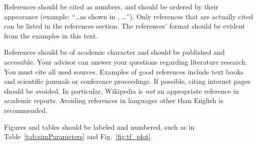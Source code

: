 \documentclass[journal, a4paper]{IEEEtran}
\begin{document}
    References should be cited as numbers, and should be ordered by their appearance (example: ``\ldots as shown in \cite{HOP96}, \ldots'').
    Only references that are actually cited can be listed in the references section.
    The references' format should be evident from the examples in this text.

    References should be of academic character and should be published and accessible.
    Your advisor can answer your questions regarding literature research.
    You must cite all used sources.
    Examples of good references include text books and scientific journals or conference proceedings.
    If possible, citing internet pages should be avoided. In particular, Wikipedia is \emph{not} an appropriate reference in academic reports.
    Avoiding references in languages other than English is recommended.

    Figures and tables should be labeled and numbered, such as in Table~\ref{tab:simParameters} and Fig.~\ref{fig:tf_plot}.
\end{document}
